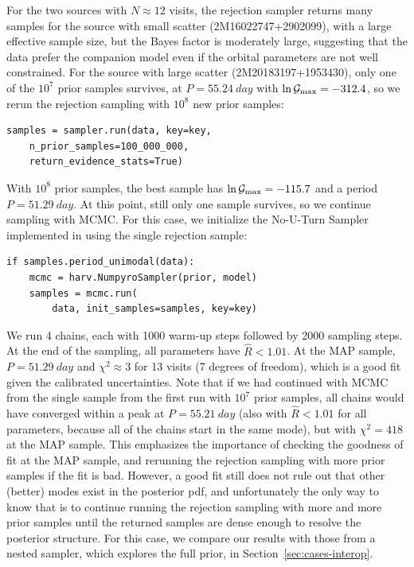 \documentclass[twocolumn]{AASTeX7/aastex701}
\begin{document}
For the two sources with $N \approx 12$ visits, the rejection sampler returns many
samples for the source with small scatter (2M16022747+2902099), with a large effective
sample size, but the Bayes factor is moderately large, suggesting that the data
prefer the companion model even if the orbital parameters are not well constrained.
For the source with large scatter (2M20183197+1953430), only one of the $10^7$ prior
samples survives, at $P = 55.24~\unit{day}$ with $\ln \mathcal{G}_{\rm max} = -312.4$,
so we rerun the rejection sampling with $10^8$ new prior samples:
\begin{lstlisting}
samples = sampler.run(data, key=key,
    n_prior_samples=100_000_000,
    return_evidence_stats=True)
\end{lstlisting}
\noindent
With $10^8$ prior samples, the best sample has $\ln \mathcal{G}_{\rm max} = -115.7$ and
a period $P = 51.29~\unit{day}$.
At this point, still only one sample survives, so we continue sampling with MCMC.
For this case, we initialize the No-U-Turn Sampler \citep[NUTS;][]{Hoffman:2011}
implemented in  using the single rejection sample:
\begin{lstlisting}
if samples.period_unimodal(data):
    mcmc = harv.NumpyroSampler(prior, model)
    samples = mcmc.run(
        data, init_samples=samples, key=key)
\end{lstlisting}
\noindent
We run 4 chains, each with 1000 warm-up steps followed by 2000 sampling steps.
At the end of the sampling, all parameters have $\hat{R} < 1.01$.
At the MAP sample, $P = 51.29~\unit{day}$ and $\chi^2 \approx 3$ for 13 visits (7
degrees of freedom), which is a good fit given the calibrated uncertainties.
Note that if we had continued with MCMC from the single sample from the first run with
$10^7$ prior samples, all chains would have converged within a peak at $P =
55.21~\unit{day}$ (also with $\hat{R} < 1.01$ for all parameters, because all of the
chains start in the same mode), but with $\chi^2 = 418$ at the MAP sample.
This emphasizes the importance of checking the goodness of fit at the MAP sample, and
rerunning the rejection sampling with more prior samples if the fit is bad.
However, a good fit still does not rule out that other (better) modes exist in the
posterior pdf, and unfortunately the only way to know that is to continue running the
rejection sampling with more and more prior samples until the returned samples are dense
enough to resolve the posterior structure.
For this case, we compare our results with those from a nested sampler, which explores
the full prior, in Section~\ref{sec:cases-interop}.
\end{document}
